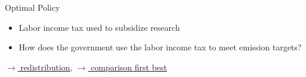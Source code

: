 \documentclass[11pt,aspectratio=169]{beamer}
\newcommand{\ar}{$\Rightarrow$ \ }
\begin{document}
\begin{frame}{Optimal Policy}
\begin{figure}[h!!]
\begin{subfigure}{0.45\textwidth}
			\end{subfigure}
		\end{figure}
		\vspace{3mm}
		\pause
		\begin{block}{}
			\begin{itemize}
				\item Labor income tax used to subsidize research
				\item \alert{How does the government use the labor income tax to meet emission targets?}
			\end{itemize}
		\end{block}	
		\vspace{-5.7mm}
		\hfill
		\hyperlink{Redis}{\tiny{$\rightarrow$ redistribution,}}
\hyperlink{compfb}{\tiny{$\rightarrow$ comparison first best}}
\hypertarget{backOPT}{}
	\end{frame}

	

	
\end{document}
